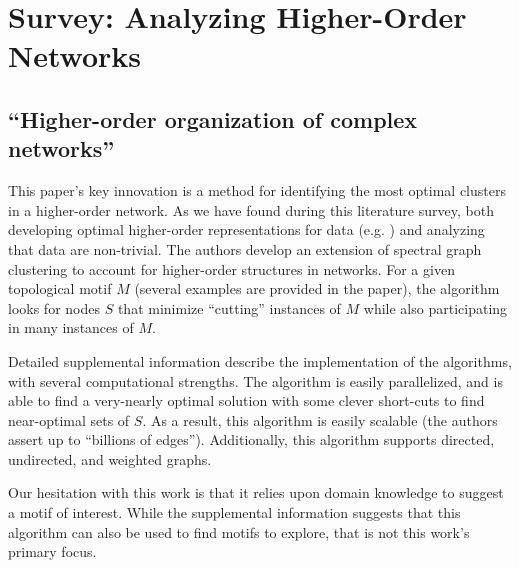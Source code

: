 \documentclass[sigconf]{acmart}
\begin{document}
\section{Survey: Analyzing Higher-Order Networks}

\subsection{``Higher-order organization of complex networks'' \cite{Benson2016}} \label{paper:HONorganization}
This paper's key innovation is a method for identifying the most optimal clusters in a higher-order network.
As we have found during this literature survey, both developing optimal higher-order representations for data (e.g. \cite{Scholtes2017}) and analyzing that data are non-trivial.
The authors develop an extension of spectral graph clustering to account for higher-order structures in networks.
For a given topological motif $M$ (several examples are provided in the paper), the algorithm looks for nodes $S$ that minimize ``cutting'' instances of $M$ while also participating in many instances of $M$.

Detailed supplemental information describe the implementation of the algorithms, with several computational strengths. The algorithm is easily parallelized, and is able to find a very-nearly optimal solution with some clever short-cuts to find near-optimal sets of $S$. As a result, this algorithm is easily scalable (the authors assert up to ``billions of edges''). Additionally, this algorithm supports directed, undirected, and weighted graphs.

Our hesitation with this work is that it relies upon domain knowledge to suggest a motif of interest. While the supplemental information suggests that this algorithm can also be used to find motifs to explore, that is not this work's primary focus.
\end{document}
